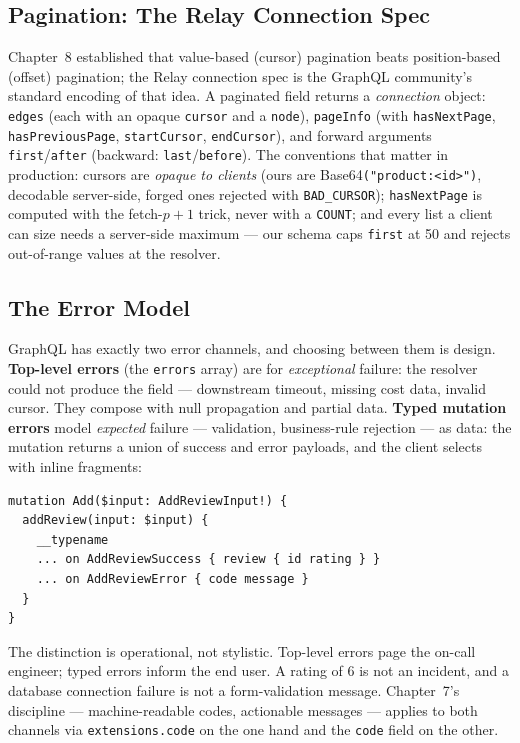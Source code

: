 \subsection{Pagination: The Relay Connection Spec}
\label{sec:ch12-pagination}

Chapter~8 established that value-based (cursor) pagination beats
position-based (offset) pagination; the Relay connection spec is the
GraphQL community's standard encoding of that idea. A paginated field
returns a \emph{connection} object: \texttt{edges} (each with an opaque
\texttt{cursor} and a \texttt{node}), \texttt{pageInfo} (with
\texttt{hasNextPage}, \texttt{hasPreviousPage}, \texttt{startCursor},
\texttt{endCursor}), and forward arguments \texttt{first}/\texttt{after}
(backward: \texttt{last}/\texttt{before}). The conventions that matter in
production: cursors are \emph{opaque to clients} (ours are
Base64\texttt{("product:<id>")}, decodable server-side, forged ones
rejected with \texttt{BAD\_CURSOR}); \texttt{hasNextPage} is computed with
the fetch-$p{+}1$ trick, never with a \texttt{COUNT}; and every list a
client can size needs a server-side maximum --- our schema caps
\texttt{first} at 50 and rejects out-of-range values at the resolver.

\subsection{The Error Model}
\label{sec:ch12-errors}

GraphQL has exactly two error channels, and choosing between them is
design. \textbf{Top-level errors} (the \texttt{errors} array) are for
\emph{exceptional} failure: the resolver could not produce the field ---
downstream timeout, missing cost data, invalid cursor. They compose with
null propagation and partial data. \textbf{Typed mutation errors} model
\emph{expected} failure --- validation, business-rule rejection --- as
data: the mutation returns a union of success and error payloads, and the
client selects with inline fragments:

\begin{verbatim}
mutation Add($input: AddReviewInput!) {
  addReview(input: $input) {
    __typename
    ... on AddReviewSuccess { review { id rating } }
    ... on AddReviewError { code message }
  }
}
\end{verbatim}

The distinction is operational, not stylistic. Top-level errors page the
on-call engineer; typed errors inform the end user. A rating of 6 is not
an incident, and a database connection failure is not a form-validation
message. Chapter~7's discipline --- machine-readable codes, actionable
messages --- applies to both channels via \texttt{extensions.code} on the
one hand and the \texttt{code} field on the other.

